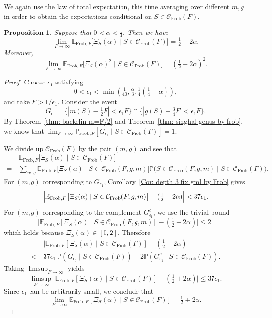 \documentclass[12pt]{amsart}
\def\E{{\mathbb E}}
\renewcommand{\P}{\mathbb{P}}
\newcommand{\cC}{\mathcal{C}}
\newcommand{\Frob}{\text{Frob}}
\newtheorem{proposition}[theorem]{Proposition}
\begin{document}
We again use the law of total expectation, this time averaging over different $m,g$ in order to obtain the expectations conditional on $S\in\cC_{\Frob}(F)$.


\begin{proposition}\label{Prop: small alpha depth 3 by Frob}
Suppose that $0<\alpha<\frac{1}{4}$.
Then we have
\[
\lim_{F\to\infty} \E_{\Frob,F} \big[\Xi_S(\alpha)\mid S\in \cC_{\Frob}(F)\big] = \tfrac{1}{2}+2\alpha. 
\]
Moreover,
\[
\lim_{F\to\infty} \E_{\Frob,F} \big[\Xi_S(\alpha)^2\mid S\in \cC_{\Frob}(F)\big] = (\tfrac{1}{2}+2\alpha)^2. 
\]
\end{proposition}
\begin{proof}
Choose $\epsilon_1$ satisfying
\[
0<\epsilon_1<\min\left(\tfrac{1}{40},\tfrac{\alpha}{3},\tfrac{1}{4}(\tfrac{1}{4}-\alpha)\right),
\]
and take $F>1/\epsilon_1$. Consider the event
\[G_{\epsilon_1}=\big\{|m(S)-\tfrac{1}{2} F|<\epsilon_1 F\big\}\cap\big\{|g(S)-\tfrac{3}{4} F|<\epsilon_1 F\big\}.\]
By Theorem~\ref{thm: backelin m=F/2} and Theorem~\ref{thm: singhal genus by frob}, we know that
$\lim_{F\to\infty} \P_{\Frob,F}[G_{\epsilon_1}\mid S\in\cC_{\Frob}(F)]=1$.

We divide up $\cC_{\Frob}(F)$ by the pair $(m,g)$ and see that 
\begin{align*}
&\ \E_{\Frob,F}\big[\Xi_S(\alpha)\mid S\in\cC_{\Frob}(F)\big]\\
= &\ \sum_{m,g}\E_{\Frob,F}\big[\Xi_S(\alpha)\mid S\in\cC_{\Frob}(F,g,m)\big]
\P\big(S\in\cC_{\Frob}(F,g,m)\mid S\in\cC_{\Frob}(F)\big).
\end{align*}
For $(m,g)$ corresponding to $G_{\epsilon_1}$, Corollary~\ref{Cor: depth 3 fix gml by Frob} gives
\[
\Bigl|\E_{\Frob,F}\big[\Xi_S(\alpha)\mid S\in\cC_{\Frob}(F,g,m)\big]-(\tfrac{1}{2}+2\alpha)\Bigr|
< 37\epsilon_1.
\]
For $(m,g)$ corresponding to the complement $G_{\epsilon_1}^c$, we use the trivial bound
\[
\big|\E_{\Frob,F}[\Xi_S(\alpha)\mid S\in\cC_{\Frob}(F,g,m)]-(\tfrac{1}{2}+2\alpha)\big|\leq 2,
\]
which holds because $\Xi_S(\alpha)\in[0,2]$.
Therefore
\begin{align*}
&\ \Big|\E_{\Frob,F}[\Xi_S(\alpha)\mid S\in\cC_{\Frob}(F)]-(\tfrac{1}{2}+2\alpha)\Big|\\
<&\  37\epsilon_1\ \P(G_{\epsilon_1}\mid S\in\cC_{\Frob}(F))
+2\P(G_{\epsilon_1}^c\mid S\in\cC_{\Frob}(F)).
\end{align*}
Taking $\limsup_{F\to\infty}$ yields
\[
\limsup_{F\to\infty}\Big|\E_{\Frob,F}[\Xi_S(\alpha)\mid S\in\cC_{\Frob}(F)]-(\tfrac{1}{2}+2\alpha)\Big|
\leq 37\epsilon_1.
\]
Since $\epsilon_1$ can be arbitrarily small, we conclude that
\[\lim_{F\to\infty}\E_{\Frob,F}[\Xi_S(\alpha)\mid S\in\cC_{\Frob}(F)]=\tfrac{1}{2}+2\alpha.\]


\end{proof}
\end{document}
